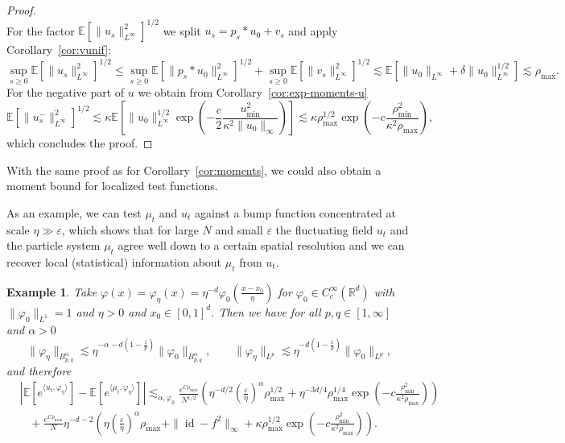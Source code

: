 \documentclass[a4paper,12pt]{article}
\newtheorem{example}[theorem]{Example}
\newcommand{\R}{\mathbb{R}}
\newcommand{\E}{\mathbb{E}}
\begin{document}
\begin{proof}
\begin{equation*}
  \end{equation*}
  For the factor $\E[\| u_s \|_{L^\infty}^2]^{1 / 2}$ we  split $u_s = p_s\ast u_0 + v_s$ and apply Corollary~\ref{cor:vunif}:
  \[
     \sup_{s \geq 0} \mathbb{E} [\| u_s \|_{L^\infty}^2]^{1 / 2} \leq \sup_{s \geq 0} \mathbb{E} [\| p_s\ast u_0 \|_{L^\infty}^2]^{1 / 2} + \sup_{s \geq 0} \mathbb{E} [\| v_s \|_{L^\infty}^2]^{1 / 2} \lesssim   \E[\|u_0\|_{L^\infty} + \delta\|u_0\|_{L^\infty}^{1/2}] \lesssim \rho_{\max}.
  \]
  For the negative part of $u$ we obtain from Corollary~\ref{cor:exp-moments-u}
  \[
    \E[\|u_s^-\|_{L^\infty}^2]^{1/2} \lesssim \kappa \E\left[\|u_0\|_{L^\infty}^{1/2}  \exp \left( -\frac{c}{2} \frac{u_{\min}^2}{\kappa^2 \|u_0\|_\infty}\right)\right] \lesssim \kappa \rho_{\max}^{1/2}\exp \left( -c \frac{\rho_{\min}^2}{\kappa^2 \rho_{\max}}\right),
  \]
  which concludes the proof.
\end{proof}


With the same proof as for Corollary~\ref{cor:moments}, we could also obtain a moment bound for localized test functions.


As an example, we can test $\mu_t$ and $u_t$ against a bump function concentrated at scale $\eta\gg \varepsilon$, which shows that for large $N$ and small $\varepsilon$ the fluctuating field $u_t$ and the particle system $\mu_t$ agree well  down to
a certain spatial resolution and we can recover local (statistical) information about $\mu_t$ from $u_t$.

\begin{example}
    Take $\varphi(x) = \varphi_\eta(x) = \eta^{-d} \varphi_0 (\frac{x-x_0}{\eta})$ for $\varphi_0 \in C^\infty_c(\R^d)$ with $\|\varphi_0\|_{L^1}=1$ and $\eta>0$ and $x_0 \in [0,1]^d$.  Then we have for all $p,q \in [1,\infty]$ and $\alpha>0$
    \[\|\varphi_\eta\|_{B^\alpha_{p,q}} \lesssim \eta^{-\alpha-d(1-\tfrac1p)}  \|\varphi_0\|_{B^\alpha_{p,q}},\qquad \|\varphi_\eta\|_{L^p} \lesssim \eta^{-d(1-\tfrac1p)}  \|\varphi_0\|_{L^p},
    \]
    and therefore
    \begin{align}\nonumber
    &| \mathbb{E} [e^{\langle u_t, \varphi_\eta \rangle}] -\mathbb{E} [e^{\langle
    \mu_t, \varphi_\eta \rangle}] |  \lesssim_{\alpha,\varphi_0} \frac{e^{C\rho_{\max}}}{N^{1/2}}\left( \eta^{-d/2}\left(\frac\varepsilon\eta\right)^\alpha \rho_{\max}^{1/2} + \eta^{-3d/4} \rho_{\max}^{1/4}\exp\left(-c \frac{\rho_{\min}^2}{\kappa^2\rho_{\max}}\right)\right)\\
    & \hspace{10pt}+ \frac{e^{C \rho_{\max}}}{N} \eta^{-d-2} \left(\eta
    \left(\frac{\varepsilon}{\eta}\right)^{\alpha} \rho_{\max} + \| \operatorname{id} - f^2 \|_{\infty} + \kappa \rho_{\max}^{1/2} \exp\left(-c \frac{\rho_{\min}^2}{\kappa^2\rho_{\max}}\right) \right). \nonumber
  \end{align}
\end{example}
\end{document}
